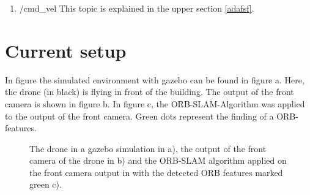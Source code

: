 	\begin{enumerate}
	\item{/cmd\_vel}
	This topic is explained in the upper section \ref{adafsf}.
	\end{enumerate}
	
	
	\section{Current setup}
	
	In figure \cite{fig:simfigs} the simulated environment with gazebo can be found in figure a. Here, the drone (in black) is flying in front of the building. 
	The output of the front camera is shown in figure b. In figure c, the ORB-SLAM-Algorithm was applied to the output of the front camera. Green dots represent the 
	finding of a ORB-features.
	
	\begin{figure}%
    \centering
    \qquad
	\qquad
    \caption{
	The drone in a gazebo simulation in a), the output of the front camera of the drone in b) and
	the ORB-SLAM algorithm applied on the front camera output in with the detected ORB features marked green c).
	}%
    \label{fig:simfigs}%
	\end{figure}
	
